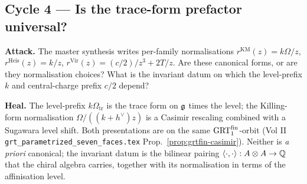 \subsection*{Cycle 4 --- Is the trace-form prefactor universal?}

\textbf{Attack.} The master synthesis writes per-family normalisations
$r^{\mathrm{KM}}(z) = k\Omega/z$, $r^{\mathrm{Heis}}(z) = k/z$,
$r^{\mathrm{Vir}}(z) = (c/2)/z^3 + 2T/z$. Are these canonical forms,
or are they normalisation choices? What is the invariant datum on
which the level-prefix $k$ and central-charge prefix $c/2$ depend?

\textbf{Heal.} The level-prefix $k\Omega_{\mathrm{tr}}$ is the trace
form on $\mathfrak{g}$ times the level; the Killing-form normalisation
$\Omega/((k+h^\vee)z)$ is a Casimir rescaling combined with a
Sugawara level shift. Both presentations are on the same
$\mathrm{GRT}_1^{\mathrm{fin}}$-orbit
(Vol II \texttt{grt\_parametrized\_seven\_faces.tex}
Prop.~\ref{prop:grtfin-casimir}). Neither is \emph{a priori} canonical;
the invariant datum is the bilinear pairing
$\langle\cdot,\cdot\rangle: A \otimes A \to \mathbb{Q}$ that the chiral
algebra carries, together with its normalisation in terms of the
affinisation level.


